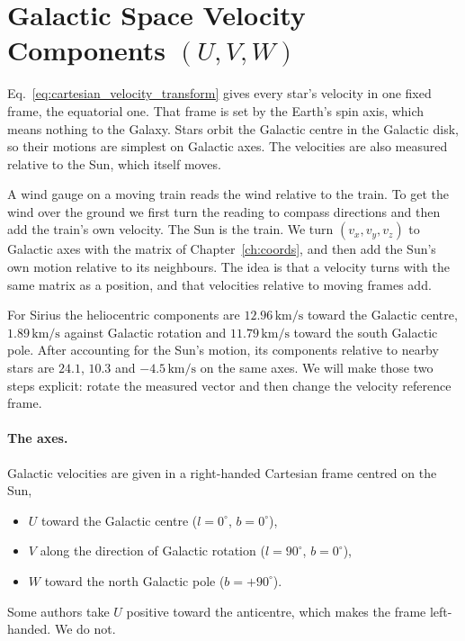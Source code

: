 \section{Galactic Space Velocity Components \texorpdfstring{$(U, V, W)$}{(U, V, W)}}
\label{as:sec:uvw}

Eq.~\eqref{eq:cartesian_velocity_transform} gives every star's velocity in one fixed frame, the equatorial one. That frame is set by the Earth's spin axis, which means nothing to the Galaxy. Stars orbit the Galactic centre in the Galactic disk, so their motions are simplest on Galactic axes. The velocities are also measured relative to the Sun, which itself moves.

A wind gauge on a moving train reads the wind relative to the train. To get the wind over the ground we first turn the reading to compass directions and then add the train's own velocity. The Sun is the train. We turn $(v_x,v_y,v_z)$ to Galactic axes with the matrix of Chapter~\ref{ch:coords}, and then add the Sun's own motion relative to its neighbours. The idea is that a velocity turns with the same matrix as a position, and that velocities relative to moving frames add.

For Sirius the heliocentric components are $12.96\,\mathrm{km/s}$ toward the Galactic centre, $1.89\,\mathrm{km/s}$ against Galactic rotation and $11.79\,\mathrm{km/s}$ toward the south Galactic pole. After accounting for the Sun's motion, its components relative to nearby stars are $24.1$, $10.3$ and $-4.5\,\mathrm{km/s}$ on the same axes. We will make those two steps explicit: rotate the measured vector and then change the velocity reference frame.

\paragraph{The axes.} Galactic velocities are given in a right-handed Cartesian frame centred on the Sun,
\begin{itemize}
	\item $U$ toward the Galactic centre ($l = 0^\circ$, $b = 0^\circ$),
	\item $V$ along the direction of Galactic rotation ($l = 90^\circ$, $b = 0^\circ$),
	\item $W$ toward the north Galactic pole ($b = +90^\circ$).
\end{itemize}
Some authors take $U$ positive toward the anticentre, which makes the frame left-handed. We do not.

